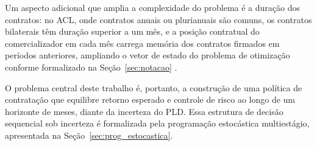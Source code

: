 Um aspecto adicional que amplia a complexidade do problema é a duração dos contratos: no ACL, onde contratos anuais ou plurianuais são comuns, os contratos bilaterais têm duração superior a um mês, e a posição contratual do comercializador em cada mês carrega memória dos contratos firmados em períodos anteriores, ampliando o vetor de estado do problema de otimização conforme formalizado na Seção~\ref{sec:notacao} \cite{bessa2006,guerreiro2017}.

O problema central deste trabalho é, portanto, a construção de uma política de contratação que equilibre retorno esperado e controle de risco ao longo de um horizonte de meses, diante da incerteza do PLD. Essa estrutura de decisão sequencial sob incerteza é formalizada pela programação estocástica multiestágio, apresentada na Seção~\ref{sec:prog_estocastica}.

